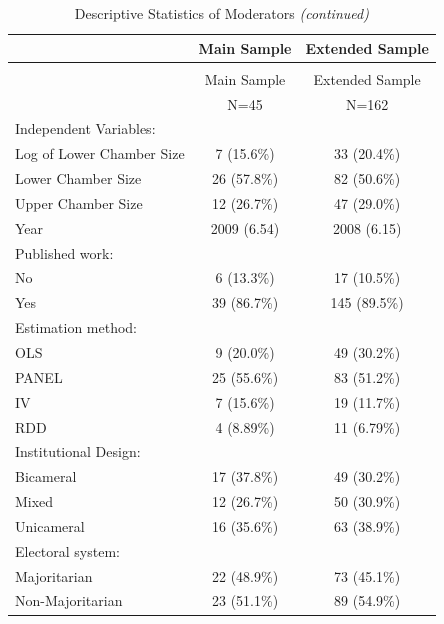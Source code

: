 \documentclass[11pt,a4paper,]{article}
\begin{document}
\begin{longtable}[t]{lcc}
\caption{\label{tab:descriptive}Descriptive Statistics of Moderators}\\
\toprule
  & Main Sample & Extended Sample\\
\endfirsthead
\caption[]{Descriptive Statistics of Moderators \textit{(continued)}}\\
\toprule
  & Main Sample & Extended Sample\\
\midrule
\endhead

\endfoot
\bottomrule
\endlastfoot
 & N=45 & N=162\\
\midrule
Independent Variables: &  & \\
\hspace{1em}Log of Lower Chamber Size & 7 (15.6\%) & 33 (20.4\%)\\
\hspace{1em}Lower Chamber Size & 26 (57.8\%) & 82 (50.6\%)\\
\hspace{1em}Upper Chamber Size & 12 (26.7\%) & 47 (29.0\%)\\
Year & 2009 (6.54) & 2008 (6.15)\\
Published work: &  & \\
\hspace{1em}No & 6 (13.3\%) & 17 (10.5\%)\\
\hspace{1em}Yes & 39 (86.7\%) & 145 (89.5\%)\\
Estimation method: &  & \\
\hspace{1em}OLS & 9 (20.0\%) & 49 (30.2\%)\\
\hspace{1em}PANEL & 25 (55.6\%) & 83 (51.2\%)\\
\hspace{1em}IV & 7 (15.6\%) & 19 (11.7\%)\\
\hspace{1em}RDD & 4 (8.89\%) & 11 (6.79\%)\\
Institutional Design: &  & \\
\hspace{1em}Bicameral & 17 (37.8\%) & 49 (30.2\%)\\
\hspace{1em}Mixed & 12 (26.7\%) & 50 (30.9\%)\\
\hspace{1em}Unicameral & 16 (35.6\%) & 63 (38.9\%)\\
Electoral system: &  & \\
\hspace{1em}Majoritarian & 22 (48.9\%) & 73 (45.1\%)\\
\hspace{1em}Non-Majoritarian & 23 (51.1\%) & 89 (54.9\%)\\*
\end{longtable}
\normalsize
\end{document}
